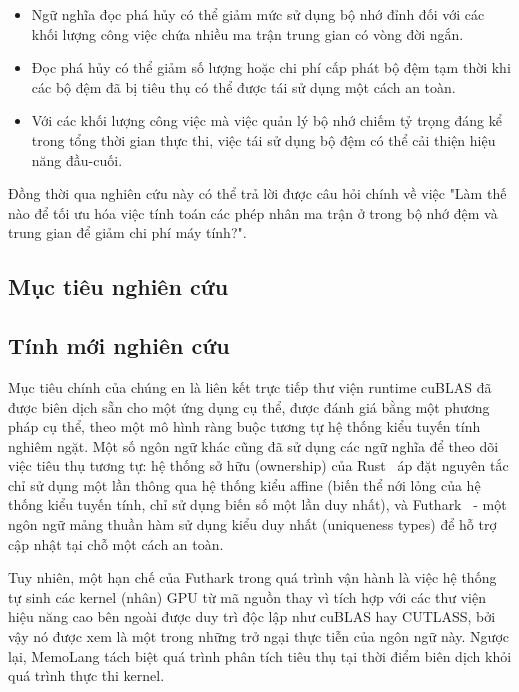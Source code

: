\documentclass[a4paper]{article}
\begin{document}
	\begin{itemize}
	\item Ngữ nghĩa đọc phá hủy có thể giảm mức sử dụng bộ nhớ đỉnh đối với các khối lượng công việc chứa nhiều ma trận trung gian có vòng đời ngắn.
	\item Đọc phá hủy có thể giảm số lượng hoặc chi phí cấp phát bộ đệm tạm thời khi các bộ đệm đã bị tiêu thụ có thể được tái sử dụng một cách an toàn.
	\item Với các khối lượng công việc mà việc quản lý bộ nhớ chiếm tỷ trọng đáng kể trong tổng thời gian thực thi, việc tái sử dụng bộ đệm có thể cải thiện hiệu năng đầu-cuối.
	\end{itemize}

    Đồng thời qua nghiên cứu này có thể trả lời được câu hỏi chính về việc "Làm thế nào để tối ưu hóa việc tính toán các phép nhân ma trận ở trong bộ nhớ đệm và trung gian để giảm chi phí máy tính?".
	
	\subsection{Mục tiêu nghiên cứu}
	
	
	\subsection{Tính mới nghiên cứu}
	
	Mục tiêu chính của chúng en là liên kết trực tiếp thư viện runtime cuBLAS đã được biên dịch sẵn cho một ứng dụng cụ thể, được đánh giá bằng một phương pháp cụ thể, theo một mô hình ràng buộc tương tự hệ thống kiểu tuyến tính nghiêm ngặt. Một số ngôn ngữ khác cũng đã sử dụng các ngữ nghĩa để theo dõi việc tiêu thụ tương tự: hệ thống sở hữu (ownership) của Rust~\cite{rust} áp đặt nguyên tắc chỉ sử dụng một lần thông qua hệ thống kiểu affine (biến thể nới lỏng của hệ thống kiểu tuyến tính, chỉ sử dụng biến số một lần duy nhất), và Futhark~\cite{futhark} - một ngôn ngữ mảng thuần hàm sử dụng kiểu duy nhất (uniqueness types) để hỗ trợ cập nhật tại chỗ một cách an toàn.
    
    Tuy nhiên, một hạn chế của Futhark trong quá trình vận hành là việc hệ thống tự sinh các kernel (nhân) GPU từ mã nguồn thay vì tích hợp với các thư viện hiệu năng cao bên ngoài được duy trì độc lập như cuBLAS hay CUTLASS, bởi vậy nó được xem là một trong những trở ngại thực tiễn của ngôn ngữ này. Ngược lại, MemoLang tách biệt quá trình phân tích tiêu thụ tại thời điểm biên dịch khỏi quá trình thực thi kernel.
	
\end{document}
